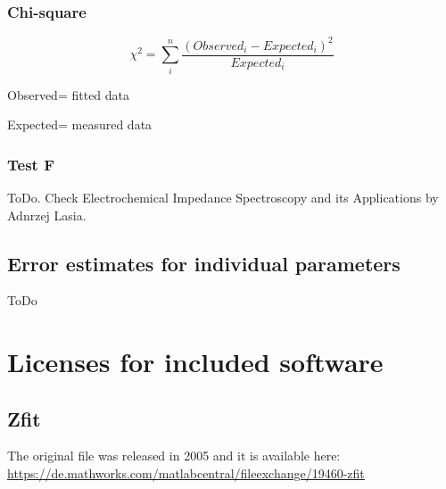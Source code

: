 \documentclass[10pt,a4paper,oneside]{book}
\begin{document}
\subsection{Chi-square}

\[ \chi^2 = \sum_i^n{\dfrac{(Observed_i-Expected_i)^2}{Expected_i}} \]

Observed= fitted data

Expected= measured data

\subsection{Test F}

ToDo. Check Electrochemical Impedance Spectroscopy and its Applications by Adnrzej Lasia.

\section{Error estimates for individual parameters}

ToDo


\newpage{}
\chapter{Licenses for included software}

\section{Zfit}

The original file was released in 2005 and it is available here:\\

\url{https://de.mathworks.com/matlabcentral/fileexchange/19460-zfit}
\end{document}
